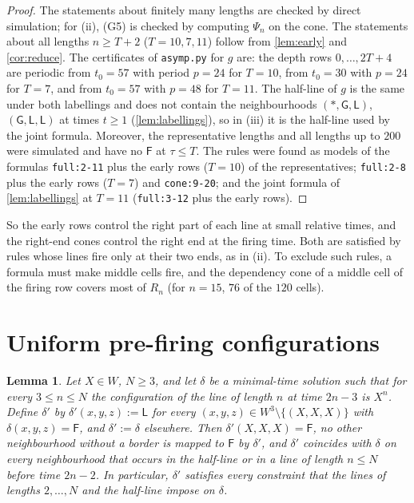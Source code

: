 \documentclass[11pt]{article}
\newtheorem{lemma}[theorem]{Lemma}
\theoremstyle{definition}
\theoremstyle{remark}
\newcommand{\Lq}{\mathsf L}
\newcommand{\Gq}{\mathsf G}
\newcommand{\Fq}{\mathsf F}
\begin{document}
\begin{proof}
The statements about finitely many lengths are checked by direct simulation;
for (ii), (G5) is checked by computing $\Psi_n$ on the cone. The statements
about all lengths $n\ge T+2$ ($T=10,7,11$) follow from \cref{lem:early} and
\cref{cor:reduce}. The certificates of \texttt{asymp.py} for $g$ are: the
depth rows $0,\dots,2T+4$ are periodic from $t_0=57$ with period $p=24$ for
$T=10$, from $t_0=30$ with $p=24$ for $T=7$, and from $t_0=57$ with $p=48$
for $T=11$. The half-line of $g$ is the same under both labellings and does not
contain the neighbourhoods $(\ast,\Gq,\Lq)$, $(\Gq,\Lq,\Lq)$ at times $t\ge1$
(\cref{lem:labellings}), so in (iii) it is the half-line used by the joint
formula. Moreover, the representative
lengths and all lengths up to $200$ were simulated and have no $\Fq$ at
$\tau\le T$. The rules were found as models of the formulas \texttt{full:2-11}
plus the early rows ($T=10$) of the representatives; \texttt{full:2-8} plus
the early rows ($T=7$) and \texttt{cone:9-20}; and the joint formula of
\cref{lem:labellings} at $T=11$ (\texttt{full:3-12} plus the early rows).
\end{proof}

So the early rows control the right part of each line at small relative times,
and the right-end cones control the right end at the firing time. Both are
satisfied by rules whose lines fire only at their two ends, as in (ii). To
exclude such rules, a formula must make middle cells fire, and the dependency
cone of a middle cell of the firing row covers most of $R_n$ (for $n=15$, $76$
of the $120$ cells).

\section{Uniform pre-firing configurations}\label{sec:classes}

\begin{lemma}\label{lem:class}
Let $X\in W$, $N\ge3$, and let $\delta$ be a minimal-time solution such that for
every $3\le n\le N$ the configuration of the line of length $n$ at time $2n-3$
is $X^n$. Define $\delta'$ by $\delta'(x,y,z):=\Lq$ for every $(x,y,z)\in
W^3\setminus\{(X,X,X)\}$ with $\delta(x,y,z)=\Fq$, and $\delta':=\delta$
elsewhere. Then $\delta'(X,X,X)=\Fq$, no other neighbourhood without a border is
mapped to $\Fq$ by $\delta'$, and $\delta'$ coincides with $\delta$ on every
neighbourhood that occurs in the half-line or in a line of length $n\le N$
before time $2n-2$. In particular, $\delta'$ satisfies every constraint that
the lines of lengths $2,\dots,N$ and the half-line impose on $\delta$.
\end{lemma}
\end{document}
